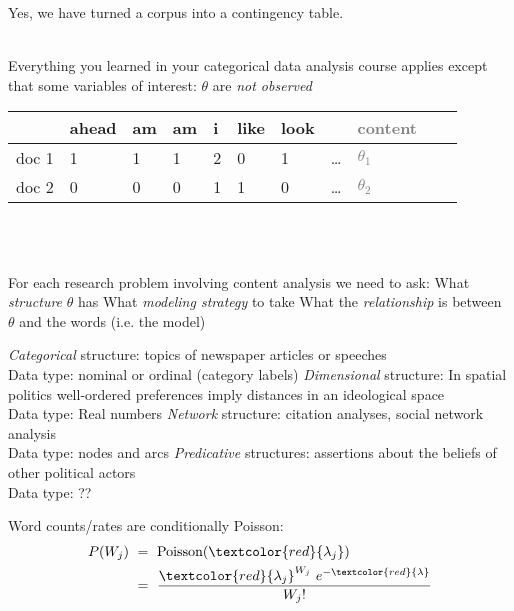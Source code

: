 \documentclass{mediumfoils}
\begin{document}

Yes, we have turned a corpus into a contingency table.

~\\
Everything you learned in your categorical data analysis course applies
\ita
\itm except that some variables of interest: $\theta$ are \textit{not observed}
\itz



\begin{center}
\small
\begin{tabular}{rllllllllll}\toprule
        & ahead & am & am & i & like & look &  & \textcolor{gray}{content} \\ \midrule
doc 1  & 1     & 1  & 1  & 2 & 0    & 1    & \ldots & \textcolor{gray}{$\theta_1$} \\
doc 2  & 0     & 0  & 0  & 1 & 1    & 0    & \ldots & \textcolor{gray}{$\theta_2$} \\ \bottomrule
\end{tabular} 
\normalsize
\end{center}
~\\\

For each research problem involving content analysis we need to ask:
\ita
\itm What \textit{structure} $\theta$ has
\itm What \textit{modeling strategy} to take
\itm What the \textit{relationship} is between $\theta$ and the words (i.e. the model)
\itz

 
\ita
\itm \textsl{Categorical} structure: topics of newspaper articles or speeches\\Data type: nominal or ordinal (category labels)
\itm \textsl{Dimensional} structure: In spatial politics well-ordered preferences imply distances in an ideological space\\Data type: Real numbers
\itm \textsl{Network} structure: citation analyses, social network analysis\\Data type: nodes and arcs
\itm \textsl{Predicative} structures: assertions about the beliefs of other political actors\\Data type: ??
\itz

 
Word counts/rates are conditionally Poisson:
\begin{align*}
P(W_j) &~=~ \text{Poisson}(\textcolor{red}{\lambda_{j}})\\
         &~=~ \frac{\textcolor{red}{\lambda_{j}}^{W_{j}}~e^{-\textcolor{red}{\lambda}}}{W_{j}!}
\end{align*}
\end{document}
